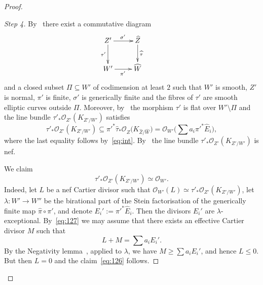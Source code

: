 \documentclass[11pt]{article}
\theoremstyle{definition}
\newenvironment{proofc}{\begin{proof}}{\end{proof}}
\numberwithin{equation}{section}
\numberwithin{figure}{section}
\numberwithin{table}{section}
\newcommand{\OO}{\mathcal{O}}
\newenvironment{step}[1]{\begin{proof}[#1]}{\let\qed\relax\end{proof}}
\begin{document}
\begin{proofc}
\begin{step}{Step 4}
By~\cite[Lemma~6.8]{Vi95} there exist a commutative diagram
\[
\xymatrix{ Z' \ar[d]_-{\tau'} \ar[r]^{\sigma'} & {\widehat Z} \ar[d]^-{\widehat \tau} \\
W' \ar[r]_{\pi'} & \widehat W & }
\]
and a closed subset $\Pi\subseteq W'$ of codimension at least $2$ such that $W'$ is smooth, $Z'$ is normal, $\pi'$ is finite, $\sigma' $ is generically finite and the fibres of $\tau'$ are smooth elliptic curves outside $\Pi$. Moreover, by~\cite[Lemma~6.9]{Vi95} the morphism $\tau'$ is flat over $W' \setminus \Pi$ and the line bundle $\tau'_*\OO_{Z'}(K_{Z'/W'})$ satisfies
\begin{equation}\label{eq:127}
\tau'_*\OO_{Z'}(K_{Z'/W'}) \subseteq \pi'^*\widehat\tau_*\OO_{\widehat Z}\big(K_{\widehat Z/ \widehat W}\big) = \OO_{W'}\big(\sum a_i \pi'^*\widehat E_i\big),
\end{equation}
where the last equality follows by~\eqref{eq:int}. By~\cite[Theorem~6.12]{Vi95} the line bundle $\tau'_*\OO_{Z'}(K_{Z' / W'})$ is nef.

We claim
\begin{equation}\label{eq:126}
\tau'_*\OO_{Z'}(K_{Z' / W'})\simeq\OO_{W'}.
\end{equation}
Indeed, let $L$ be a nef Cartier divisor such that $\OO_{W'}(L)\simeq\tau'_*\OO_{Z'}(K_{Z' / W'})$, let $\lambda\colon W'\to W''$ be the birational part of the Stein factorisation of the generically finite map $\widehat \pi \circ \pi'$, and denote $E_i':=\pi'^*\widehat E_i$. Then the divisors $E_i'$ are $\lambda$-exceptional. By~\eqref{eq:127} we may assume that there exists an effective Cartier divisor $M$ such that
\[
L+M=\sum a_i E_i'.
\]
By the Negativity lemma~\cite[Lemma~3.39]{KM98}, applied to $\lambda$, we have $M\geq \sum a_i E_i'$, and hence $L\leq0$. But then $L=0$ and the claim~\eqref{eq:126} follows.
\end{step}


\end{proofc}
\end{document}
